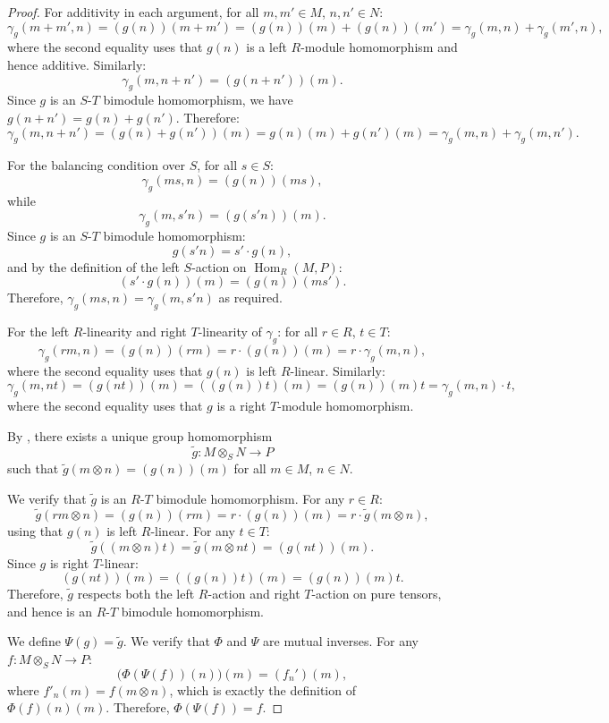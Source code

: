 \begin{proof}
    For additivity in each argument, for all $m,m' \in M$, $n,n' \in N$:
    $$\gamma_g(m+m', n) = (g(n))(m+m') = (g(n))(m) + (g(n))(m') = \gamma_g(m,n) + \gamma_g(m',n),$$
    where the second equality uses that $g(n)$ is a left $R$-module homomorphism and hence additive. Similarly:
    $$\gamma_g(m, n+n') = (g(n+n'))(m).$$
    Since $g$ is an $S$-$T$ bimodule homomorphism, we have $g(n+n') = g(n) + g(n')$. Therefore:
    $$\gamma_g(m,n+n') = (g(n)+g(n'))(m) = g(n)(m) + g(n')(m) = \gamma_g(m,n) + \gamma_g(m,n').$$

    For the balancing condition over $S$, for all $s \in S$:
    $$\gamma_g(ms, n) = (g(n))(ms),$$
    while
    $$\gamma_g(m, s'n) = (g(s'n))(m).$$
    Since $g$ is an $S$-$T$ bimodule homomorphism:
    $$g(s'n) = s' \cdot g(n),$$
    and by the definition of the left $S$-action on $\operatorname{Hom}_R(M, P)$:
    $$(s' \cdot g(n))(m) = (g(n))(ms').$$
    Therefore, $\gamma_g(ms, n) = \gamma_g(m, s'n)$ as required.

    For the left $R$-linearity and right $T$-linearity of $\gamma_g$: for all $r \in R$, $t \in T$:
    $$\gamma_g(rm, n) = (g(n))(rm) = r \cdot (g(n))(m) = r \cdot \gamma_g(m,n),$$
    where the second equality uses that $g(n)$ is left $R$-linear. Similarly:
    $$\gamma_g(m, nt) = (g(nt))(m) = ((g(n))t)(m) = (g(n))(m)t = \gamma_g(m,n) \cdot t,$$
    where the second equality uses that $g$ is a right $T$-module homomorphism.

    By , there exists a unique group homomorphism
    $$\widetilde{g} : M \otimes_S N \to P$$
    such that $\widetilde{g}(m \otimes n) = (g(n))(m)$ for all $m \in M$, $n \in N$.

    We verify that $\widetilde{g}$ is an $R$-$T$ bimodule homomorphism. For any $r \in R$:
    $$\widetilde{g}(rm \otimes n) = (g(n))(rm) = r \cdot (g(n))(m) = r \cdot \widetilde{g}(m \otimes n),$$
    using that $g(n)$ is left $R$-linear. For any $t \in T$:
    $$\widetilde{g}((m \otimes n)t) = \widetilde{g}(m \otimes nt) = (g(nt))(m).$$
    Since $g$ is right $T$-linear:
    $$(g(nt))(m) = ((g(n))t)(m) = (g(n))(m)t.$$
    Therefore, $\widetilde{g}$ respects both the left $R$-action and right $T$-action on pure tensors, and hence is an $R$-$T$ bimodule homomorphism.

    We define $\Psi(g) = \widetilde{g}$. We verify that $\Phi$ and $\Psi$ are mutual inverses. For any $f : M \otimes_S N \to P$:
    $$\bigl(\Phi(\Psi(f))(n)\bigr)(m) = (f_n')(m),$$
    where $f'_n(m) = f(m \otimes n)$, which is exactly the definition of $\Phi(f)(n)(m)$. Therefore, $\Phi(\Psi(f)) = f$.


\end{proof}
